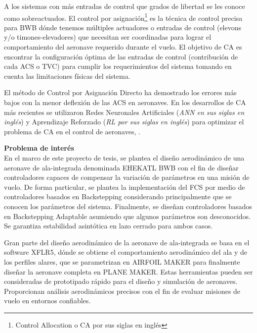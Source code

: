 A los sistemas con más entradas de control que grados de libertad se les conoce como sobreactuados. El control por asignación\footnote{Control Allocation o CA por sus siglas en inglés} es la técnica de control precisa para BWB dónde tenemos múltiples actuadores o entradas de control (elevons y/o timones-elevadores) que necesitan ser coordinadas para lograr el comportamiento del aeronave requerido durante el vuelo. 
El objetivo de CA es encontrar la configuración óptima de las entradas de control (contribución de cada ACS o TVC) para cumplir los requerimientos del sistema tomando en cuenta las limitaciones físicas del sistema. 

El método de Control  por Asignación Directo ha demostrado los errores más bajos con la menor deflexión de las ACS en aeronaves.
En los desarrollos de CA más recientes se utilizaron Redes Neuronales Artificiales (\textit{ANN en sus siglas en inglés}) y Aprendizaje Reforzado (\textit{RL por sus siglas en inglés}) para optimizar el problema de CA en el control de aeronaves, \cite{Yann2016}. 

\medskip

\textbf{Problema de interés}\\
En el marco de este proyecto de tesis, se plantea el diseño aerodinámico de una aeronave de ala-integrada denominada EHEKATL BWB con el fin de diseñar controladores capaces de compensar la variación de parámetros en una misión de vuelo. 
De forma particular, se plantea la implementación del FCS por medio de controladores basados en Backstepping considerando principalmente que se conocen los parámetros del sistema. 
Finalmente, se diseñan controladores basados en Backstepping Adaptable asumiendo que algunos parámetros son desconocidos. Se garantiza estabilidad asintótica en lazo cerrado para ambos casos. 

Gran parte del diseño aerodinámico de la aeronave de ala-integrada se basa en el software XFLR5, dónde se obtiene el comportamiento aerodinámico del ala y de los perfiles alares, que se parametrizan en AIRFOIL MAKER para finalmente diseñar la aeronave completa en PLANE MAKER. Estas herramientas pueden ser consideradas de prototipado rápido para el diseño y simulación de aeronaves. Proporcionan análisis aerodinámicos precisos con el fin de evaluar misiones de vuelo en entornos confiables. 

